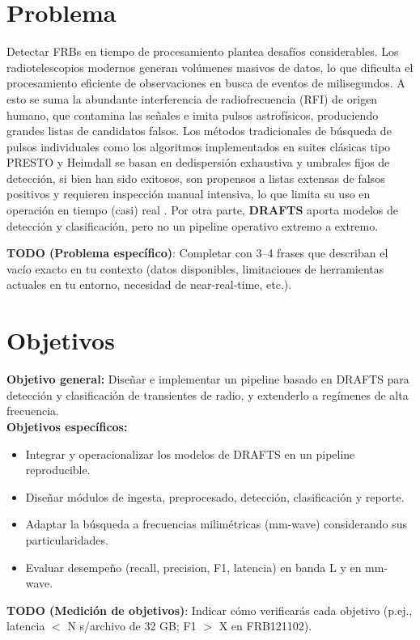 \section{Problema}
Detectar FRBs en tiempo de procesamiento plantea desafíos considerables. Los radiotelescopios modernos generan volúmenes masivos de datos, lo que dificulta el procesamiento eficiente de observaciones en busca de eventos de milisegundos. A esto se suma la abundante interferencia de radiofrecuencia (RFI) de origen humano, que contamina las señales e imita pulsos astrofísicos, produciendo grandes listas de candidatos falsos. Los métodos tradicionales de búsqueda de pulsos individuales como los algoritmos implementados en suites clásicas tipo PRESTO y Heimdall se basan en dedispersión exhaustiva y umbrales fijos de detección, si bien han sido exitosos, son propensos a listas extensas de falsos positivos y requieren inspección manual intensiva, lo que limita su uso en operación en tiempo (casi) real \cite{Cordes_2003, Ransom_2003, Barsdell_2012}. Por otra parte, \textbf{DRAFTS} aporta modelos de detección y clasificación, pero no un pipeline operativo extremo a extremo.

\textbf{TODO (Problema específico)}: Completar con 3–4 frases que describan el vacío exacto en tu contexto (datos disponibles, limitaciones de herramientas actuales en tu entorno, necesidad de near-real-time, etc.).

\section{Objetivos}
\textbf{Objetivo general:} Diseñar e implementar un pipeline basado en DRAFTS para detección y clasificación de transientes de radio, y extenderlo a regímenes de alta frecuencia.\\
\textbf{Objetivos específicos:}
\begin{itemize}
  \item Integrar y operacionalizar los modelos de DRAFTS en un pipeline reproducible.
  \item Diseñar módulos de ingesta, preprocesado, detección, clasificación y reporte.
  \item Adaptar la búsqueda a frecuencias milimétricas (mm-wave) considerando sus particularidades.
  \item Evaluar desempeño (recall, precision, F1, latencia) en banda L y en mm-wave.
\end{itemize}

\textbf{TODO (Medición de objetivos)}: Indicar cómo verificarás cada objetivo (p.ej., latencia \(<\) N s/archivo de 32 GB; F1 \(>\) X en FRB121102).

